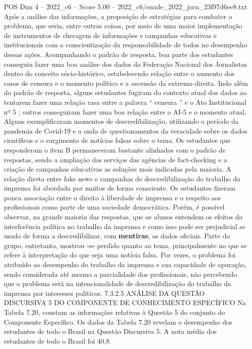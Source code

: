 \begin{textsample}{POS Dim 4 – 2022\_c6 – Score 5.00 – 2022\_c6/enade\_2022\_jorn\_23f97d6ee8.txt}
Após a análise das informações, a proposição de estratégias para combater o problema, que seria, entre outras coisas, por meio de uma maior implementação de instrumentos de checagem de informações e campanhas educativas e institucionais com a conscientização da responsabilidade de todos no desempenho dessas ações.
Acompanhando o padrão de resposta, boa parte dos estudantes conseguiu fazer uma boa análise dos dados da Federação Nacional dos Jornalistas dentro do conceito sócio-histórico, estabelecendo relação entre o aumento dos casos de censura e o momento político e a ascensão da extrema-direita.
Indo além do padrão de resposta, alguns estudantes fugiram do contexto atual dos dados ao tentarem fazer uma relação rasa entre a palavra “ censura ” e o Ato Institucional nº 5 ; outros conseguiram fazer uma boa relação entre o AI-5 e o momento atual.
Alguns exemplificaram momentos de descredibilização, utilizando o período da pandemia de Covid-19 e a onda de questionamentos da veracidade sobre os dados científicos e o surgimento de notícias falsas sobre o tema.
Os estudantes que responderam o item B permaneceram bastante alinhados com o padrão de respostas, sendo a ampliação dos serviços das agências de fact-checking e a criação de campanhas educativas as soluções mais indicadas pela maioria.
A relação direta entre fake news e campanhas de descredibilização do trabalho da imprensa foi abordada por muitos de forma consciente.
Os estudantes fizeram pouca associação entre o direito à liberdade de imprensa e o respeito aos profissionais como parte de uma sociedade democrática.
Porém, é possível observar, na grande maioria das respostas, que os alunos entendem os efeitos da interferência política no trabalho da imprensa e como isso pode ser prejudicial se usado de forma a descredibilizar, com \textbf{mentiras}, os dados oficiais.
Parte do grupo, entretanto, mostrou -se perdido quanto ao tema, principalmente no que se refere à interpretação do que seja uma notícia falsa.
Por vezes, o problema foi atribuído ao desempenho do trabalho da imprensa e sua capacidade de apuração, sendo considerada até mesmo a parcialidade dos profissionais, não percebendo que o problema está na intencionalidade de descredibilização do trabalho da imprensa por interesses políticos. 7.3.2.5 ANÁLISE DA QUESTÃO DISCURSIVA 5 DO COMPONENTE DE CONHECIMENTO ESPECÍFICO Na Tabela 7.20, constam as informações relativas à Questão 5 do conjunto do Componente Específico.
Os dados da Tabela 7.20 revelam o desempenho dos estudantes de todo o Brasil na Questão Discursiva 5.
A nota média dos estudantes de todo o Brasil foi 40,8.

\end{textsample}
